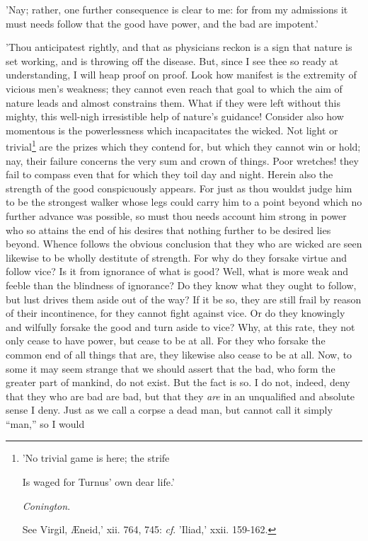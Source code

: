 'Nay; rather, one further consequence is clear to me: for from my
admissions it must needs follow that the good have power, and the bad
are impotent.'

'Thou anticipatest rightly, and that as physicians reckon is a sign that
nature is set working, and is throwing off the disease. But, since I see
thee so ready at understanding, I will heap proof on proof. Look how
manifest is the extremity of vicious men's weakness; they cannot even
reach that goal to which the aim of nature leads and almost constrains
them. What if they were left without this mighty, this well-nigh
irresistible help of nature's guidance! Consider also how momentous is
the powerlessness which incapacitates the wicked. Not light or
trivial\footnote{'No trivial game is here; the strife

Is waged for Turnus' own dear life.'

\emph{Conington}.

See Virgil, Æneid,' xii. 764, 745: \emph{cf}. 'Iliad,' xxii. 159-162.} are the prizes which they contend for, but which they cannot
win or hold; nay, their failure concerns the very sum and crown of
things. Poor wretches! they fail to compass even that for which they
toil day and night. Herein also the strength of the good conspicuously
appears. For just as thou wouldst judge him to be the strongest walker
whose legs could carry him to a point beyond which no further advance
was possible, so must thou needs account him strong in power who so
attains the end of his desires that nothing further to be desired lies
beyond. Whence follows the obvious conclusion that they who are wicked
are seen likewise to be wholly destitute of strength. For why do they
forsake virtue and follow vice? Is it from ignorance of what is good?
Well, what is more weak and feeble than the blindness of ignorance? Do
they know what they ought to follow, but lust drives them aside out of
the way? If it be so, they are still frail by reason of their
incontinence, for they cannot fight against vice. Or do they knowingly
and wilfully forsake the good and turn aside to vice? Why, at this rate,
they not only cease to have power, but cease to be at all. For they who
forsake the common end of all things that are, they likewise also cease
to be at all. Now, to some it may seem strange that we should assert
that the bad, who form the greater part of mankind, do not exist. But
the fact is so. I do not, indeed, deny that they who are bad are bad,
but that they \emph{are} in an unqualified and absolute sense I deny. Just as
we call a corpse a dead man, but cannot call it simply ``man,'' so I would

